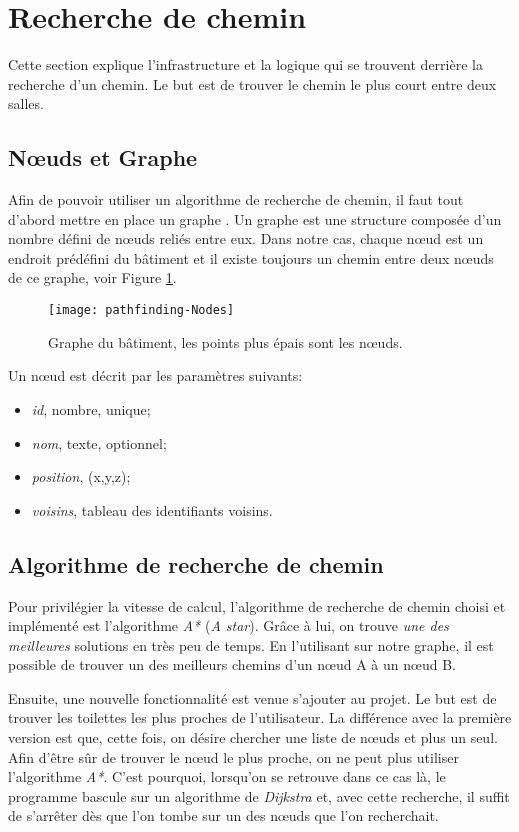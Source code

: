 \section{Recherche de chemin}
Cette section explique l'infrastructure et la logique qui se trouvent derrière la recherche d'un chemin. Le but est de trouver le chemin le plus court entre deux salles.

\subsection{Nœuds et Graphe}
Afin de pouvoir utiliser un algorithme de recherche de chemin, il faut tout d'abord mettre en place un graphe \cite{wiki-graph}. Un graphe est une structure composée d'un nombre défini de nœuds reliés entre eux. Dans notre cas, chaque nœud est un endroit prédéfini du bâtiment et il existe toujours un chemin entre deux nœuds de ce graphe, voir Figure \ref{fig:pathfinding-nodes}.

\begin{figure}
	\centering
	\texttt{[image: pathfinding-Nodes]}
	\caption{Graphe du bâtiment, les points plus épais sont les nœuds.}
	\label{fig:pathfinding-nodes}
\end{figure}

Un nœud est décrit par les paramètres suivants:
\begin{itemize}[noitemsep]
	\item \emph{id}, nombre, unique;
	\item \emph{nom}, texte, optionnel;
	\item \emph{position}, (x,y,z);
	\item \emph{voisins}, tableau des identifiants voisins.
\end{itemize}

\subsection{Algorithme de recherche de chemin}
Pour privilégier la vitesse de calcul, l'algorithme de recherche de chemin choisi et implémenté est l'algorithme \emph{A*} \cite{wiki-astar} (\textit{A star}). Grâce à lui, on trouve \textit{une des meilleures} solutions en très peu de temps. En l'utilisant sur notre graphe, il est possible de trouver un des meilleurs chemins d'un nœud A à un nœud B.

Ensuite, une nouvelle fonctionnalité est venue s'ajouter au projet. Le but est de trouver les toilettes les plus proches de l'utilisateur. La différence avec la première version est que, cette fois, on désire chercher une liste de nœuds et plus un seul. Afin d'être sûr de trouver le nœud le plus proche, on ne peut plus utiliser l'algorithme \textit{A*}. C'est pourquoi, lorsqu'on se retrouve dans ce cas là, le programme bascule sur un algorithme de \emph{Dijkstra} \cite{wiki-dijkstra} et, avec cette recherche, il suffit de s'arrêter dès que l'on tombe sur un des nœuds que l'on recherchait.